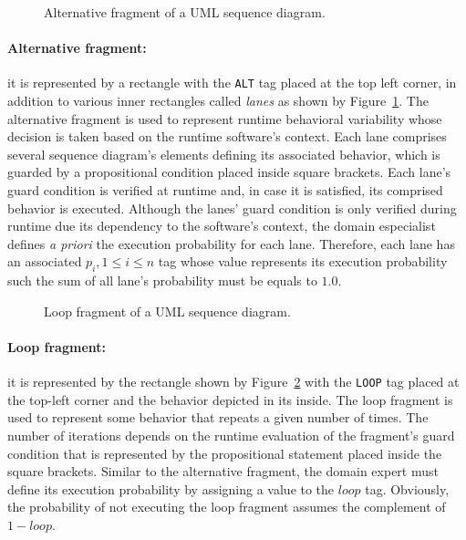 \begin{figure}[h!]
\begin{center}
\resizebox{!}{6cm}{

}
\end{center}
\caption{Alternative fragment of a UML sequence diagram.}
\label{fig:altFrag_SD}
\end{figure}

\paragraph{Alternative fragment:\label{par:altFragModeling}} it is represented
by a rectangle with the \texttt{ALT} tag placed at the top left corner, in
addition to various inner rectangles called \emph{lanes} as shown by
Figure~\ref{fig:altFrag_SD}.  The alternative fragment is used to represent
runtime behavioral variability whose decision is taken based on the runtime
software's context.  Each lane comprises several sequence diagram's elements
defining its associated behavior, which is guarded by a propositional condition
placed inside square brackets. Each lane's guard condition is verified at
runtime and, in case it is satisfied, its comprised behavior is executed.
Although the lanes' guard condition is only verified during runtime due its
dependency to the software's context, the domain especialist defines \emph{a
priori} the execution probability for each lane. Therefore, each lane has an
associated $p_i, 1 \leq i \leq n$ tag whose value represents its execution probability such
the sum of all lane's probability must be equals to $1.0$. 


\begin{figure}[h!]
\begin{center}
\resizebox{!}{5cm}{

}
\end{center}
\caption{Loop fragment of a UML sequence diagram.}
\label{fig:loopFrag_SD}
\end{figure}

\paragraph{Loop fragment:\label{par:loopFragModeling}} it is represented by the
rectangle shown by Figure~\ref{fig:loopFrag_SD} with the \texttt{LOOP} tag
placed at the top-left corner and the behavior depicted in its inside. The loop
fragment is used to represent some behavior that repeats a given number of
times. The number of iterations depends on the runtime evaluation of the fragment's
guard condition that is represented by the propositional statement placed inside
the square brackets. Similar to the alternative fragment, the domain expert
must define its execution probability by assigning a
value to the $loop$ tag. Obviously, the probability of not executing the loop
fragment assumes the complement of $1-loop$. 

